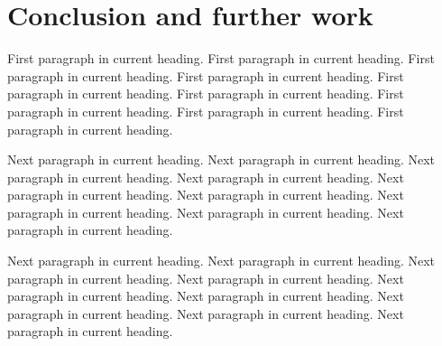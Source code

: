 
\chapter{Conclusion and further work}

\noindent First paragraph in current heading. First paragraph in current
heading. First paragraph in current heading. First paragraph in current
heading. First paragraph in current heading. First paragraph in current
heading. First paragraph in current heading. First paragraph in current
heading. First paragraph in current heading.

Next paragraph in current heading. Next paragraph in current heading.
Next paragraph in current heading. Next paragraph in current heading.
Next paragraph in current heading. Next paragraph in current heading.
Next paragraph in current heading. Next paragraph in current heading.
Next paragraph in current heading.

Next paragraph in current heading. Next paragraph in current heading.
Next paragraph in current heading. Next paragraph in current heading.
Next paragraph in current heading. Next paragraph in current heading.
Next paragraph in current heading. Next paragraph in current heading.
Next paragraph in current heading.
